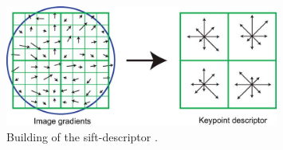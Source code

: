 \begin{figure}
    \centering
    \includegraphics[width=0.8\textwidth]{Figures/sift/descriptor.jpg}
    \caption[Extracting the sift-descriptor.]{Building of the sift-descriptor \cite{Lowe2004}.}
    \label{fig:sift_descriptor}
\end{figure}
